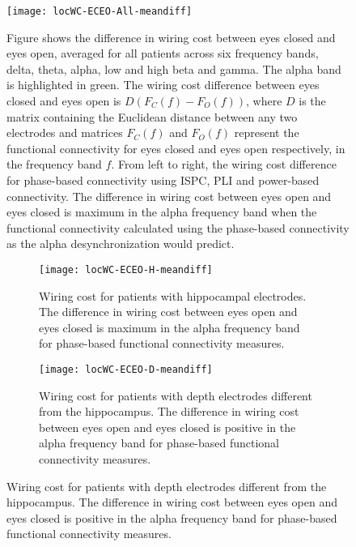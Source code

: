 \documentclass[11pt, onecolumn]{article}
\begin{document}
{%

\begin{figure}[h]
        \centering
        \texttt{[image: locWC-ECEO-All-meandiff]}
        \caption{Figure shows the difference in wiring cost between eyes closed and eyes open, averaged for all patients across six frequency bands, delta, theta, alpha, low and high beta and gamma. The alpha band is highlighted in green. The wiring cost difference between eyes closed and eyes open is ${D}(F_C(f)- F_O(f))$, where $D$ is the matrix containing the Euclidean distance between any two electrodes and matrices $F_C(f)$ and $F_O(f)$ represent the functional connectivity for eyes closed and eyes open respectively, in the frequency band $f$. From left to right, the wiring cost difference for phase-based connectivity using ISPC, PLI and power-based connectivity. The difference in wiring cost between eyes open and eyes closed is maximum in the alpha frequency band when the functional connectivity calculated using the phase-based connectivity as the alpha desynchronization would predict.}
\label{fig:figi-1}
\end{figure}
 

\begin{figure}[p]
  \begin{subfigure}[t]{0.5\linewidth}
    \centering
    \texttt{[image: locWC-ECEO-H-meandiff]} 
    \caption{Wiring cost for patients with hippocampal electrodes. The difference in wiring cost between eyes open and eyes closed is maximum in the alpha frequency band for phase-based functional connectivity measures.} 
    \label{figi-2:a} 
  \end{subfigure}%
  \hspace{1ex}
  \begin{subfigure}[t]{0.5\linewidth}
    \centering
    \texttt{[image: locWC-ECEO-D-meandiff]} 
    \caption{Wiring cost for patients with depth electrodes different from the hippocampus. The difference in wiring cost between eyes open and eyes closed is positive in the alpha frequency band for phase-based functional connectivity measures.} 
    \label{figi-2:b} 
  \end{subfigure} 
  

\end{figure}}
\end{document}
